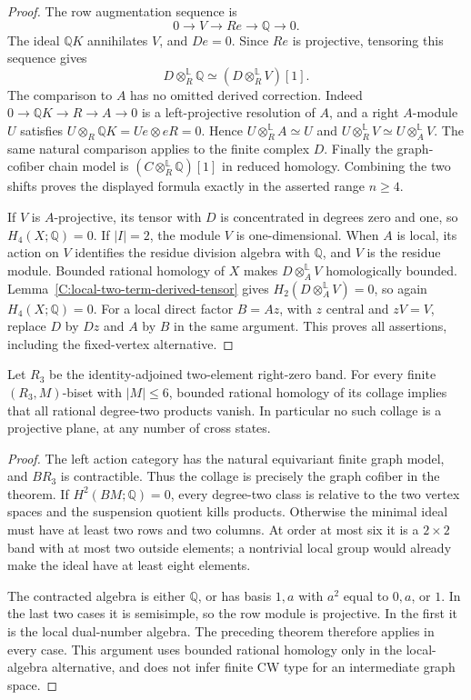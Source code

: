 \begin{proof}
The row augmentation sequence is
\[
 0\longrightarrow V\longrightarrow Re\longrightarrow\mathbb Q
       \longrightarrow0.
\]
The ideal $\mathbb QK$ annihilates $V$, and $De=0$.
Since $Re$ is projective, tensoring this sequence gives
\[
 D\otimes_R^{\mathbb L}\mathbb Q
       \simeq (D\otimes_R^{\mathbb L}V)[1].
\]
The comparison to $A$ has no omitted derived correction.
Indeed $0\to\mathbb QK\to R\to A\to0$ is a left-projective
resolution of $A$, and a right $A$-module $U$ satisfies
$U\otimes_R\mathbb QK=Ue\otimes eR=0$.  Hence
$U\otimes_R^{\mathbb L}A\simeq U$ and
$U\otimes_R^{\mathbb L}V\simeq U\otimes_A^{\mathbb L}V$.
The same natural comparison applies to the finite complex $D$.
Finally the graph-cofiber chain model is
$(C\otimes_R^{\mathbb L}\mathbb Q)[1]$ in reduced homology.
Combining the two shifts proves the displayed formula exactly
in the asserted range $n\geq4$.

If $V$ is $A$-projective, its tensor with $D$ is concentrated
in degrees zero and one, so $H_4(X;\mathbb Q)=0$.
If $|I|=2$, the module $V$ is one-dimensional.  When $A$ is
local, its action on $V$ identifies the residue division algebra
with $\mathbb Q$, and $V$ is the residue module.  Bounded rational
homology of $X$ makes $D\otimes_A^{\mathbb L}V$ homologically
bounded.  Lemma~\ref{C:local-two-term-derived-tensor} gives
$H_2(D\otimes_A^{\mathbb L}V)=0$, so again $H_4(X;\mathbb Q)=0$.
For a local direct factor $B=Az$, with $z$ central and $zV=V$,
replace $D$ by $Dz$ and $A$ by $B$ in the same argument.
This proves all assertions, including the fixed-vertex alternative.
\end{proof}

\begin{corollary}
\label{C:six-source-right-zero-all-states}
Let $R_3$ be the identity-adjoined two-element right-zero band.
For every finite $(R_3,M)$-biset with $|M|\leq6$, bounded rational
homology of its collage implies that all rational degree-two
products vanish.  In particular no such collage is a projective
plane, at any number of cross states.
\end{corollary}
\begin{proof}
The left action category has the natural equivariant finite graph
model, and $BR_3$ is contractible.  Thus the collage is precisely
the graph cofiber in the theorem.
If $H^2(BM;\mathbb Q)=0$, every degree-two class is relative to
the two vertex spaces and the suspension quotient kills products.
Otherwise the minimal ideal must have at least two rows and two
columns.  At order at most six it is a $2\times2$ band with at
most two outside elements; a nontrivial local group would already
make the ideal have at least eight elements.

The contracted algebra is either $\mathbb Q$, or has basis
$1,a$ with $a^2$ equal to $0,a$, or $1$.  In the last two cases
it is semisimple, so the row module is projective.  In the first
it is the local dual-number algebra.  The preceding theorem
therefore applies in every case.  This argument uses bounded
rational homology only in the local-algebra alternative, and
does not infer finite CW type for an intermediate graph space.
\end{proof}
